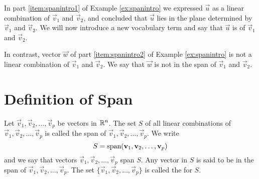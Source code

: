 \documentclass{ximera}
\begin{document}
\begin{example}
\begin{explanation}
\begin{image}
\end{image}
  
  \end{explanation}
\end{example}

In part \ref{item:spanintro1} of Example \ref{ex:spanintro} we expressed $\vec{u}$ as a linear combination of $\vec{v}_1$ and $\vec{v}_2$, and concluded that $\vec{u}$ lies in the plane determined by $\vec{v}_1$ and $\vec{v}_2$.  We will now introduce a new vocabulary term and say that $\vec{u}$ is  of $\vec{v}_1$ and $\vec{v}_2$.  

In contrast, vector $\vec{w}$ of part \ref{item:spanintro2} of Example \ref{ex:spanintro} is not a linear combination of $\vec{v}_1$ and $\vec{v}_2$.  We say that $\vec{w}$ is not in the span of $\vec{v}_1$ and $\vec{v}_2$.

\section*{Definition of Span}

\begin{definition}\label{def:span} Let $\vec{v}_1, \vec{v}_2,\ldots ,\vec{v}_p$ be vectors in $\RR^n$.  The set $S$ of all linear combinations of $\vec{v}_1, \vec{v}_2,\ldots ,\vec{v}_p$ is called the span of $\vec{v}_1, \vec{v}_2,\ldots ,\vec{v}_p$.  We write 
$$S=\textnormal{span}(\vec{v}_1, \vec{v}_2,\ldots ,\vec{v}_p)$$
and we say that vectors $\vec{v}_1, \vec{v}_2,\ldots ,\vec{v}_p$ span $S$.  Any vector in $S$ is said to be in the span of $\vec{v}_1, \vec{v}_2,\ldots ,\vec{v}_p$.  The set $\{\vec{v}_1, \vec{v}_2,\ldots ,\vec{v}_p\}$ is called the  for $S$.
\end{definition}
\end{document}
